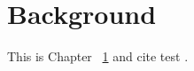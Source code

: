 \chapter{Background}
\label{chap:background}
This is Chapter~ \ref{chap:background} and cite test \cite{Knight:1986:AMF:319838.319854, Sohi:1995:MP:225830.224451, Hammond:1998:DSS:291069.291020}. 